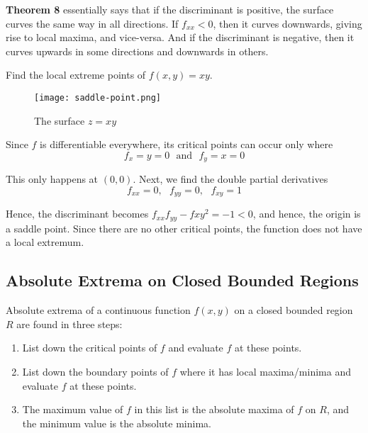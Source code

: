 \textbf{Theorem 8} essentially says that if the discriminant is positive, the surface curves the same way in all directions.
If $f_{xx} < 0$, then it curves downwards, giving rise to local maxima, and vice-versa. And if the discriminant is negative,
then it curves upwards in some directions and downwards in others.

\begin{example}
    \normalfont Find the local extreme points of $f(x, y) = xy$.

    \begin{figure}[htp]
        \centering
        \texttt{[image: saddle-point.png]}
        \caption{The surface $z = xy$}
    \end{figure}

    Since $f$ is differentiable everywhere, its critical points can occur only where
    $$f_x = y = 0 \ \ \ \text{and} \ \ \ f_y = x = 0$$

    This only happens at $(0, 0)$. Next, we find the double partial derivatives
    $$f_{xx} = 0, \ \ \ f_{yy} = 0, \ \ \ f_{xy} = 1$$

    Hence, the discriminant becomes $f_{xx}f_{yy} - f{xy}^2 = -1 < 0$, and hence, the origin is a saddle point.
    Since there are no other critical points, the function does not have a local extremum.
\end{example}


\subsection{Absolute Extrema on Closed Bounded Regions}
Absolute extrema of a continuous function $f(x, y)$ on a closed bounded region $R$ are found in three steps:
\begin{enumerate}
    \item List down the critical points of $f$ and evaluate $f$ at these points.
    \item List down the boundary points of $f$ where it has local maxima/minima and evaluate $f$ at these points.
    \item The maximum value of $f$ in this list is the absolute maxima of $f$ on $R$, and the minimum value is the
    absolute minima.
\end{enumerate}

